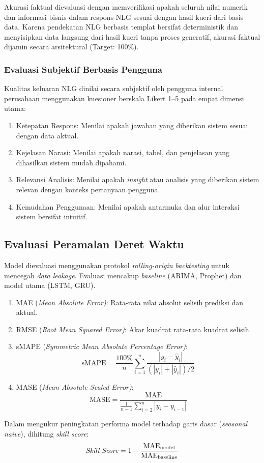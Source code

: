Akurasi faktual dievaluasi dengan memverifikasi apakah seluruh nilai numerik dan informasi bisnis dalam respons NLG sesuai dengan hasil kueri dari basis data. Karena pendekatan NLG berbasis templat bersifat deterministik dan menyisipkan data langsung dari hasil kueri tanpa proses generatif, akurasi faktual dijamin secara arsitektural (Target: 100\%).

\subsubsection{Evaluasi Subjektif Berbasis Pengguna}

Kualitas keluaran NLG dinilai secara subjektif oleh pengguna internal perusahaan menggunakan kuesioner berskala Likert 1--5 pada empat dimensi utama:
\begin{enumerate}
    \item Ketepatan Respons: Menilai apakah jawaban yang diberikan sistem sesuai dengan data aktual.
    \item Kejelasan Narasi: Menilai apakah narasi, tabel, dan penjelasan yang dihasilkan sistem mudah dipahami.
    \item Relevansi Analisis: Menilai apakah \textit{insight} atau analisis yang diberikan sistem relevan dengan konteks pertanyaan pengguna.
    \item Kemudahan Penggunaan: Menilai apakah antarmuka dan alur interaksi sistem bersifat intuitif.
\end{enumerate}

\subsection{Evaluasi Peramalan Deret Waktu}
\label{subsec:eval-forecasting}

Model dievaluasi menggunakan protokol \textit{rolling-origin backtesting} untuk mencegah \textit{data leakage}. Evaluasi mencakup \textit{baseline} (ARIMA, Prophet) dan model utama (LSTM, GRU).

\begin{enumerate}
    \item MAE (\textit{Mean Absolute Error)}: Rata-rata nilai absolut selisih prediksi dan aktual.
    \item RMSE (\textit{Root Mean Squared Error)}: Akar kuadrat rata-rata kuadrat selisih.
    \item sMAPE (\textit{Symmetric Mean Absolute Percentage Error)}:
    \begin{equation}
    \text{sMAPE} = \frac{100\%}{n} \sum_{i=1}^{n} \frac{|y_i - \hat{y}_i|}{(|y_i| + |\hat{y}_i|)/2}
    \end{equation}

    \item MASE (\textit{Mean Absolute Scaled Error)}:
    \begin{equation}
    \text{MASE} = \frac{\text{MAE}}{\frac{1}{n-1} \sum_{i=2}^{n} |y_i - y_{i-1}|}
    \end{equation}
\end{enumerate}

Dalam mengukur peningkatan performa model terhadap garis dasar (\textit{seasonal naive}), dihitung \textit{skill score}:
\begin{equation}
\text{\textit{Skill Score}} = 1 - \frac{\text{MAE}_{\text{model}}}{\text{MAE}_{\text{baseline}}}
\end{equation}
